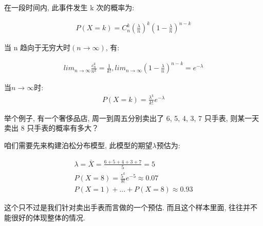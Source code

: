 在一段时间内, 此事件发生 k 次的概率为: 

\begin{align*}
  P(X=k) = C_n^k(\frac{\lambda}{n})^k(1-\frac{\lambda}{n})^{n-k}
\end{align*}

当 n 趋向于无穷大时$(n \to \infty)$, 有:

\begin{align*}
  lim_{n\to \infty}\frac{c_n^k}{n^k}=\frac{1}{k!}, lim_{n\to \infty}(1-\frac{\lambda}{n})^{n-k} = e^{-\lambda}
\end{align*}

当$n \to \infty$时:
\begin{align*}
  P(X=k) = \frac{\lambda^k}{k!}e^{-\lambda}
\end{align*}

举个例子, 有一个奢侈品店, 周一到周五分别卖出了 6, 5, 4, 3, 7 只手表, 则某一天卖出 8 只手表的概率有多大？

咱们需要先来构建泊松分布模型, 此模型的期望$\lambda$预估为: 

\begin{align*}
  \lambda = \bar X = \frac{6+5+4+3+7}{5} = 5 \\
  P(X=8)=\frac{5^k}{8!}e^{-5}\approx0.07 \\
  P(X=1)+...+P(X=8) \approx 0.93
\end{align*}

这个只不过是我们针对卖出手表而言做的一个预估. 而且这个样本里面, 往往并不能很好的体现整体的情况. 